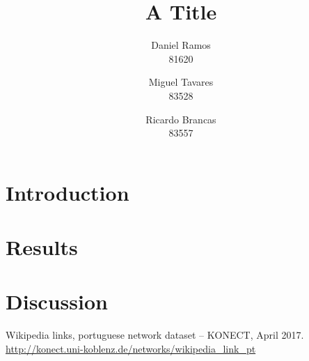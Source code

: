 \documentclass[9pt,a4paper]{article}
\title{A Title}
\author{Daniel Ramos \\ 81620 \and Miguel Tavares \\ 83528 \and Ricardo Brancas  \\ 83557}
\begin{document}
\maketitle

\section{Introduction}

\section{Results}

\section{Discussion}

\begin{thebibliography}{9}
Wikipedia links, portuguese network dataset -- KONECT, April 2017.
\\ \url{http://konect.uni-koblenz.de/networks/wikipedia\_link\_pt}

\end{thebibliography}
\end{document}
